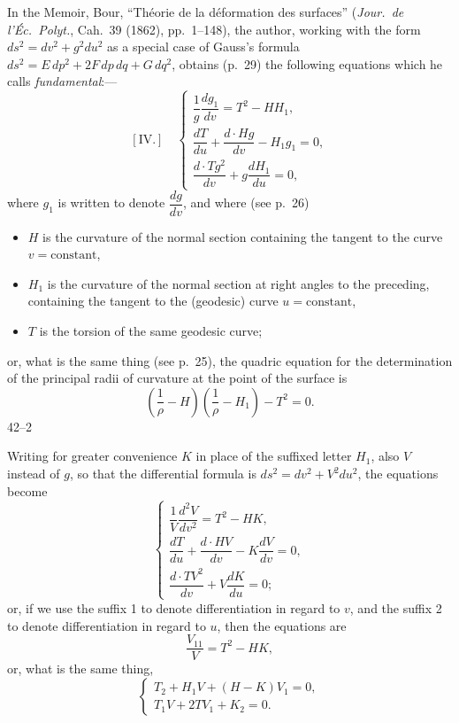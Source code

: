 \documentclass[11pt,a4paper]{article}
\begin{document}
\bigskip

\noindent
In the Memoir, Bour, ``Th\'eorie de la d\'eformation des surfaces''
(\textit{Jour.\ de l'\'Ec.\ Polyt.}, Cah.\ 39 (1862), pp.\ 1--148), the
author, working with the form $ds^{2}=dv^{2}+g^{2}du^{2}$ as a special
case of Gauss's formula $ds^{2}=E\,dp^{2}+2F\,dp\,dq+G\,dq^{2}$, obtains (p.~29)
the following equations which he calls \textit{fundamental}:---
\[
  [\text{IV.}] \quad
  \begin{cases}
    \dfrac{1}{g}\dfrac{dg_{1}}{dv}=T^{2}-HH_{1},\\[6pt]
    \dfrac{dT}{du}+\dfrac{d\cdot Hg}{dv}-H_{1}g_{1}=0,\\[6pt]
    \dfrac{d\cdot Tg^{2}}{dv}+g\dfrac{dH_{1}}{du}=0,
  \end{cases}
\]
where $g_{1}$ is written to denote $\dfrac{dg}{dv}$, and where (see p.~26)

\begin{itemize}
\item[] $H$ is the curvature of the normal section containing the tangent
  to the curve $v=\text{constant}$,
\item[] $H_{1}$ is the curvature of the normal section at right angles to
  the preceding, containing the tangent to the (geodesic) curve $u=\text{constant}$,
\item[] $T$ is the torsion of the same geodesic curve;
\end{itemize}
or, what is the same thing (see p.~25), the quadric equation for the
determination of the principal radii of curvature at the point of the
surface is
\[
  \left(\frac{1}{\rho}-H\right)\!\left(\frac{1}{\rho}-H_{1}\right)-T^{2}=0.
\]
\hfill 42--2

\newpage
\noindent
Writing for greater convenience $K$ in place of the suffixed letter
$H_{1}$, also $V$ instead of $g$, so that the differential formula is
$ds^{2}=dv^{2}+V^{2}du^{2}$, the equations become
\[
  \begin{cases}
    \dfrac{1}{V}\dfrac{d^{2}V}{dv^{2}}=T^{2}-HK,\\[6pt]
    \dfrac{dT}{du}+\dfrac{d\cdot HV}{dv}-K\dfrac{dV}{dv}=0,\\[6pt]
    \dfrac{d\cdot TV^{2}}{dv}+V\dfrac{dK}{du}=0;
  \end{cases}
\]
or, if we use the suffix 1 to denote differentiation in regard to $v$,
and the suffix 2 to denote differentiation in regard to $u$, then the
equations are
\[
  \frac{V_{11}}{V}=T^{2}-HK,
\]
or, what is the same thing,
\[
  \begin{cases}
    T_{2}+H_{1}V+(H-K)V_{1}=0,\\
    T_{1}V+2TV_{1}+K_{2}=0.
  \end{cases}
\]
\end{document}
